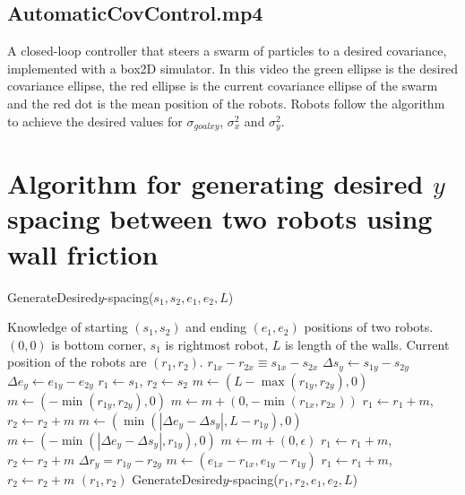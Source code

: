 \subsection{AutomaticCovControl.mp4}
A closed-loop controller that steers a swarm of particles to a desired covariance,  implemented with a box2D simulator. In this video the green ellipse is the desired covariance ellipse, the red ellipse is the current covariance ellipse of the swarm and the red dot is the mean position of the robots. Robots follow the algorithm to achieve the desired values for $\sigma_{goalxy}$, $\sigma_x^2$ and $\sigma_y^2$.

\section{ Algorithm for generating desired $y$ spacing between two robots using wall friction}\label{sec:2robotWallFriction}
\begin{algorithm}
\caption{GenerateDesired$y$-spacing($s_1,s_2,e_1,e_2,L$)}\label{alg:YControl}
\begin{algorithmic}[1]
\Require Knowledge of starting $(s_1,s_2)$ and ending $(e_1,e_2)$ positions of  two robots. 
$(0,0)$ is bottom corner, $s_1$ is rightmost robot, 
 $L$ is length of the walls. Current position of the robots are $(r_1,r_2)$.
\Ensure   $ r_{1x} - r_{2x}  \equiv s_{1x} - s_{2x} $   %
\State $ \Delta s_y  \gets s_{1y} - s_{2y} $
\State $ \Delta e_y \gets e_{1y} - e_{2y} $
\State $ r_1 \gets s_1$, $ r_2 \gets s_2$
\State $ m \gets ( L-\max( r_{1y},r_{2y}) ,0)   $ 
\Else 
\State  $ m \gets ( -\min( r_{1y},r_{2y}),0 )    $ 
\EndIf
\State $m  \gets  m + (0, -\min( r_{1x},r_{2x} ))$ 
\State $ r_1 \gets r_1+m$, $ r_2 \gets r_2+m$ 
\State $ m \gets (\min(|\Delta e_y - \Delta s_y |, L- r_{1y}), 0)$  
\Else
\State $ m \gets (-\min(|\Delta e_y - \Delta s_y |, r_{1y}), 0)$
\EndIf 
\State $m  \gets  m + (0, \epsilon)$ 
\State $ r_1 \gets r_1+m$, $ r_2 \gets r_2+m$ 
\State $\Delta r_y = r_{1y} - r_{2y}$
\State   $ m \gets (e_{1x}-r_{1x}, e_{1y}-r_{1y})$
\State $ r_1 \gets r_1+m$, $ r_2 \gets r_2+m$ 
\State  \Return $(r_1,r_2)$
\Else   
\State \Return GenerateDesired$y$-spacing($r_1,r_2,e_1,e_2,L$)
\EndIf
\end{algorithmic}
\end{algorithm}



